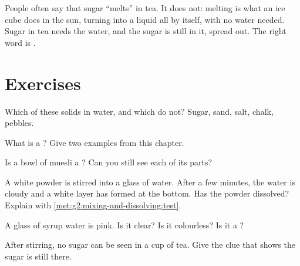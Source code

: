 \begin{remark}\label{rem:g2:mixing-and-dissolving:not-melting}
People often say that sugar ``melts'' in tea. It does not: melting is
what an ice cube does in the sun, turning into a liquid all by itself,
with no water needed. Sugar in tea needs the water, and the sugar is
still in it, spread out. The right word is \emph{}.
\end{remark}

\section{Exercises}

\begin{exercise}[$\star$]\label{exo:g2:mixing-and-dissolving:1}
Which of these solids  in water, and which do not? Sugar,
sand, salt, chalk, pebbles.
\end{exercise}

\begin{exercise}[$\star$]\label{exo:g2:mixing-and-dissolving:2}
What is a ? Give two examples from this chapter.
\end{exercise}

\begin{exercise}[$\star$]\label{exo:g2:mixing-and-dissolving:3}
Is a bowl of muesli a ? Can you still see each of its parts?
\end{exercise}

\begin{exercise}[$\star$]\label{exo:g2:mixing-and-dissolving:4}
A white powder is stirred into a glass of water. After a few minutes,
the water is cloudy and a white layer has formed at the bottom. Has the
powder dissolved? Explain with
\cref{met:g2:mixing-and-dissolving:test}.
\end{exercise}

\begin{exercise}[$\star$]\label{exo:g2:mixing-and-dissolving:5}
A glass of syrup water is pink. Is it clear? Is it colourless? Is it a
?
\end{exercise}

\begin{exercise}[$\star$]\label{exo:g2:mixing-and-dissolving:6}
After stirring, no sugar can be seen in a cup of tea. Give the clue
that shows the sugar is still there.
\end{exercise}

